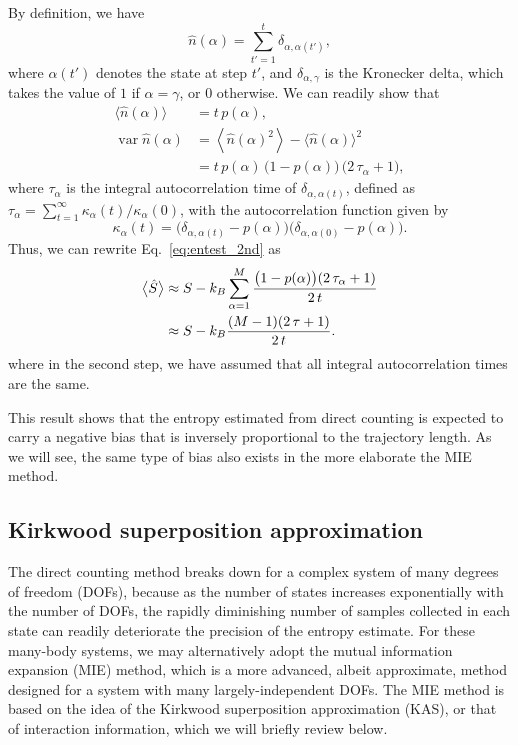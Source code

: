 \documentclass[preprint, superscriptaddress]{revtex4-1}
\begin{document}
By definition, we have
%
\begin{equation*}
  \hat{n}(\alpha) = \sum_{t' = 1}^t \delta_{\alpha, \alpha(t')},
\end{equation*}
%
where $\alpha(t')$ denotes the state at step $t'$,
and $\delta_{\alpha, \gamma}$ is the Kronecker delta,
which takes the value of $1$ if $\alpha = \gamma$, or $0$ otherwise.
%
We can readily show that
\begin{align*}
  \bigl\langle \hat{n}(\alpha) \bigr\rangle
  &=
  t \, p(\alpha), \\
  \operatorname{var}{\hat{n}(\alpha)}
  &=
  \left\langle \hat{n}(\alpha)^2 \right\rangle - \langle \hat{n}(\alpha) \rangle^2
  \\
  &=
  t \, p(\alpha) \, \bigl( 1 - p(\alpha) \bigr) \, \bigl(2 \, \tau_\alpha + 1\bigr)
  ,
\end{align*}
%
where $\tau_\alpha$ is the integral autocorrelation time of $\delta_{\alpha, \alpha(t)}$,
defined as $\tau_\alpha = \sum_{t = 1}^\infty \kappa_\alpha(t)/\kappa_\alpha(0)$,
with the autocorrelation function given by
$$
\kappa_\alpha(t) = \bigl(\delta_{\alpha, \alpha(t)} - p(\alpha)\bigr)
\bigl(\delta_{\alpha, \alpha(0)} - p(\alpha)\bigr).
$$
%
Thus, we can rewrite Eq.~\eqref{eq:entest_2nd} as
%
\begin{align}
  \bigl\langle \hat S \bigr\rangle
  &\approx
  S - k_B \sum_{\alpha = 1}^M
    \frac{ \bigl(1 - p(\alpha)\bigr) ( 2 \, \tau_\alpha + 1) } { 2 \, t }
  \notag\\
  &\approx
  S - k_B
    \frac{ (M - 1) ( 2 \, \tau + 1) } { 2 \, t }
  .
  \label{eq:Shat_ave}
\end{align}
where in the second step,
we have assumed that all integral autocorrelation times are the same.

This result shows that the entropy estimated
from direct counting
is expected to carry a negative bias
that is inversely proportional to the trajectory length.
%
As we will see, the same type of bias also exists
in the more elaborate the MIE method.


\subsection{Kirkwood superposition approximation}


The direct counting method breaks down
for a complex system of many degrees of freedom (DOFs),
because as the number of states increases exponentially with the number of DOFs,
the rapidly diminishing number of samples collected in each state
can readily deteriorate the precision of the entropy estimate.
%
For these many-body systems,
we may alternatively adopt
the mutual information expansion (MIE) method,
which is a more advanced, albeit approximate, method designed for a system
with many largely-independent DOFs.
%
The MIE method is based on the idea of
the Kirkwood superposition approximation (KAS)\cite{kirkwood1935, born1946},
or that of interaction information\cite{mcgill1954},
which we will briefly review below.
\end{document}
